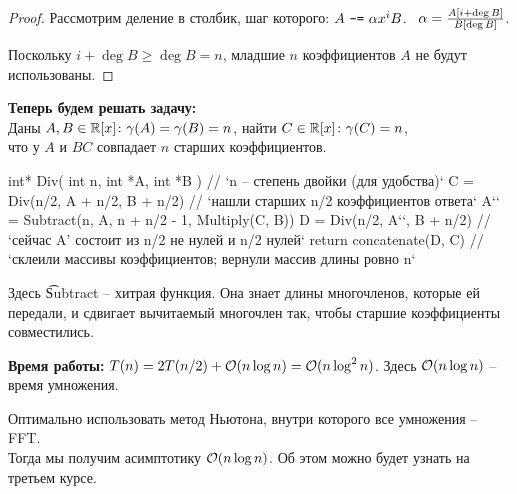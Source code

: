 \begin{proof}
Рассмотрим деление в столбик, шаг которого: $A\ \texttt{-=}\ \alpha x^i B$. \ $\alpha = {\textstyle\frac{A[i + \deg B]}{B[\deg B]}}$.

\vspace*{0.1em}
Поскольку $i + \deg B \ge \deg B = n$, младшие $n$ коэффициентов $A$ не будут использованы.
\end{proof}

{\bf Теперь будем решать задачу:} \\
Даны $A,B \in \mathbb{R}[x] \colon \gamma(A) = \gamma(B) = n$, найти $C \in \mathbb{R}[x] \colon \gamma(C) = n$, \\
что у $A$ и $BC$ совпадает $n$ старших коэффициентов.

\begin{code}
int* Div( int n, int *A, int *B ) // `n -- степень двойки (для удобства)`
  C = Div(n/2, A + n/2, B + n/2) // `нашли старших n/2 коэффициентов ответа`
  A`\color{black}{'}` = Subtract(n, A, n + n/2 - 1, Multiply(C, B))
  D = Div(n/2, A`\color{black}{'}`, B + n/2) // `сейчас A' состоит из n/2 не нулей и n/2 нулей`
  return concatenate(D, C) // `склеили массивы коэффициентов; вернули массив длины ровно n`
\end{code}

Здесь \t{Subtract} -- хитрая функция. Она знает длины многочленов, которые ей передали, и сдвигает вычитаемый многочлен так, чтобы старшие коэффициенты совместились.

\down
{\bf Время работы:} $T(n) = 2T(n/2) + \mathcal{O}(n \log n) = \mathcal{O}(n \log^2 n)$. Здесь $\mathcal{O}(n \log n)$ -- время умножения.


Оптимально использовать метод Ньютона, внутри которого все умножения -- FFT. \\
Тогда мы получим асимптотику $\mathcal{O}(n \log n)$. Об этом можно будет узнать на третьем курсе.

